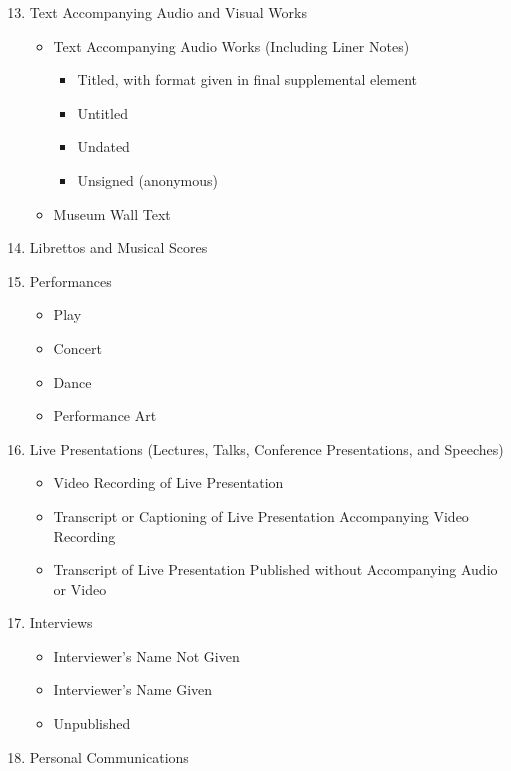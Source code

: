 \documentclass{article}
\begin{document}
\begin{enumerate}
	\setcounter{enumi}{12}
	\item Text Accompanying Audio and Visual Works
	\begin{itemize}
		\item Text Accompanying Audio Works (Including Liner Notes)
		\begin{itemize}
			\item Titled, with format given in final supplemental element
			\item Untitled
			\item Undated
			\item Unsigned (anonymous)
		\end{itemize}
		\item Museum Wall Text
	\end{itemize}
	
	\item Librettos and Musical Scores
	
	\item Performances
	\begin{itemize}
		\item Play
		\item Concert
		\item Dance
		\item Performance Art
	\end{itemize}
	
	\item Live Presentations (Lectures, Talks, Conference Presentations, and Speeches)
	\begin{itemize}
		\item Video Recording of Live Presentation
		\item Transcript or Captioning of Live Presentation Accompanying Video Recording
		\item Transcript of Live Presentation Published without Accompanying Audio or Video
	\end{itemize}
	
	\item Interviews
	\begin{itemize}
		\item Interviewer’s Name Not Given
		\item Interviewer’s Name Given
		\item Unpublished
	\end{itemize}
	
	\item Personal Communications
	

\end{enumerate}
\end{document}
